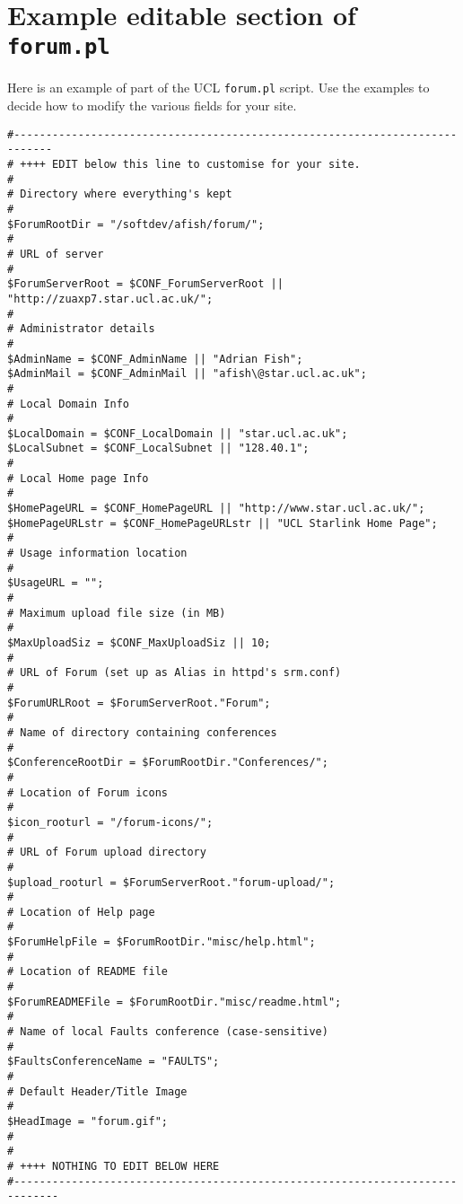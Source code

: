 \newpage
\appendix

\section{Example editable section of {\tt forum.pl}}
\label{perlmods}

Here is an example of part of the UCL {\tt forum.pl} script. Use the examples
to decide how to modify the various fields for your site.

\begin{verbatim}
#----------------------------------------------------------------------------
# ++++ EDIT below this line to customise for your site.
#
# Directory where everything's kept
#
$ForumRootDir = "/softdev/afish/forum/";
#
# URL of server
#
$ForumServerRoot = $CONF_ForumServerRoot || "http://zuaxp7.star.ucl.ac.uk/";
#
# Administrator details
#
$AdminName = $CONF_AdminName || "Adrian Fish";
$AdminMail = $CONF_AdminMail || "afish\@star.ucl.ac.uk";
#
# Local Domain Info
#
$LocalDomain = $CONF_LocalDomain || "star.ucl.ac.uk";
$LocalSubnet = $CONF_LocalSubnet || "128.40.1";
#
# Local Home page Info
#
$HomePageURL = $CONF_HomePageURL || "http://www.star.ucl.ac.uk/";
$HomePageURLstr = $CONF_HomePageURLstr || "UCL Starlink Home Page";
#
# Usage information location
#
$UsageURL = "";
#
# Maximum upload file size (in MB)
#
$MaxUploadSiz = $CONF_MaxUploadSiz || 10;
#
# URL of Forum (set up as Alias in httpd's srm.conf)
#
$ForumURLRoot = $ForumServerRoot."Forum";
#
# Name of directory containing conferences
#
$ConferenceRootDir = $ForumRootDir."Conferences/";
#
# Location of Forum icons
#
$icon_rooturl = "/forum-icons/";
#
# URL of Forum upload directory
#
$upload_rooturl = $ForumServerRoot."forum-upload/";
#
# Location of Help page
#
$ForumHelpFile = $ForumRootDir."misc/help.html";
#
# Location of README file
#
$ForumREADMEFile = $ForumRootDir."misc/readme.html";
#
# Name of local Faults conference (case-sensitive)
#
$FaultsConferenceName = "FAULTS";
#
# Default Header/Title Image
#
$HeadImage = "forum.gif";
#
#
# ++++ NOTHING TO EDIT BELOW HERE
#-----------------------------------------------------------------------------
\end{verbatim}




